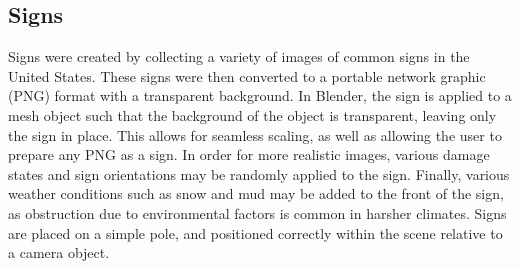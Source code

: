 \documentclass[journal]{IEEEtran}
\begin{document}
\subsection{Signs}
Signs were created by collecting a variety of images of common signs in the United States. These signs were then converted to a portable network graphic (PNG) format with a transparent background. In Blender, the sign is applied to a mesh object such that the background of the object is transparent, leaving only the sign in place. This allows for seamless scaling, as well as allowing the user to prepare any PNG as a sign. In order for more realistic images, various damage states and sign orientations may be randomly applied to the sign. Finally, various weather conditions such as snow and mud may be added to the front of the sign, as obstruction due to environmental factors is common in harsher climates. Signs are placed on a simple pole, and positioned correctly within the scene relative to a camera object. 
\end{document}
